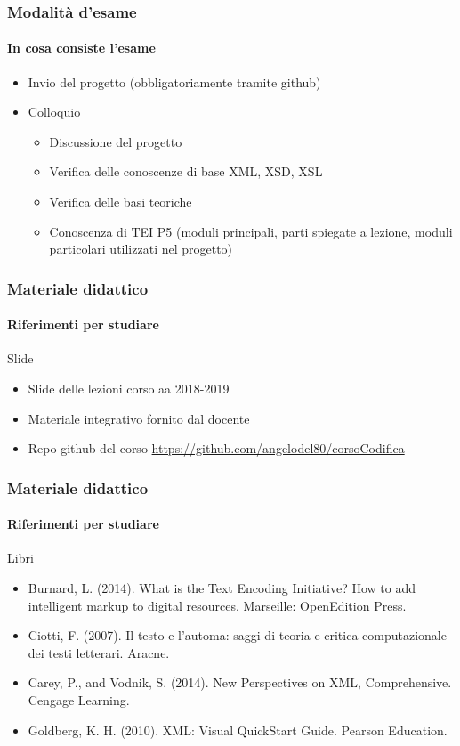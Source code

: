 \begin{frame}
	\frametitle{Modalità d’esame}
	\framesubtitle{In cosa consiste l'esame}
	\addtocounter{nframe}{1}

	\begin{itemize}
		\item Invio del progetto (obbligatoriamente tramite github)
		\item Colloquio
		      \begin{itemize}
			      \item Discussione del progetto
			      \item Verifica delle conoscenze di base XML, XSD, XSL
			      \item Verifica delle basi teoriche
			      \item Conoscenza di TEI P5 (moduli principali, parti spiegate a lezione, moduli particolari utilizzati nel progetto)
		      \end{itemize}
	\end{itemize}

\end{frame}

\begin{frame}
	\frametitle{Materiale didattico}
	\framesubtitle{Riferimenti per studiare}
	\addtocounter{nframe}{1}

	\begin{block}{Slide}
		\begin{itemize}
			\item Slide delle lezioni corso aa 2018-2019
			\item Materiale integrativo fornito dal docente
			\item Repo github del corso \href{https://github.com/angelodel80/corsoCodifica}{\url{https://github.com/angelodel80/corsoCodifica}}
		\end{itemize}
	\end{block}


\end{frame}

\begin{frame}
	\frametitle{Materiale didattico}
	\framesubtitle{Riferimenti per studiare}
	\addtocounter{nframe}{1}

	\begin{block}{Libri}
		\begin{itemize}
			\item Burnard, L. (2014). What is the Text Encoding Initiative? How to add intelligent markup to digital resources. Marseille: OpenEdition Press.
			\item Ciotti, F. (2007). Il testo e l’automa: saggi di teoria e critica computazionale dei testi letterari. Aracne.
			\item Carey, P., and Vodnik, S. (2014). New Perspectives on XML, Comprehensive. Cengage Learning.
			\item Goldberg, K. H. (2010). XML: Visual QuickStart Guide. Pearson Education.
		\end{itemize}

	\end{block}
\end{frame}

